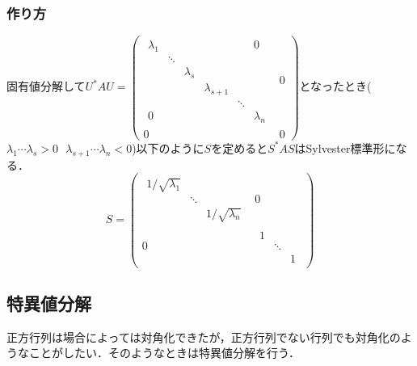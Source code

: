 \subsubsection{作り方}
固有値分解して$U^{\ast}AU=
\left( \begin{array}{c|c}
  \begin{array}{cccccc}
    {\lambda}_1&&&&&0\\
    &\ddots&&&&\\
    &&{\lambda}_s&&&\\
    &&&{\lambda}_{s+1}&&\\
    &&&&\ddots&\\
    0&&&&&{\lambda}_{n}
  \end{array}&0\\\hline
  0&0
\end{array}\right)$となったとき(${\lambda}_1 \cdots {\lambda}_s >0\ \ \ {\lambda}_{s+1}\cdots {\lambda}_n <0$)以下のように$S$を定めると$S^{\ast}AS$はSylvester標準形になる．
\begin{equation}
  S=
  \left( \begin{array}{c|c}
    \begin{array}{ccc}
      1/\sqrt{{\lambda}_1}&&\\
      &\ddots&\\
      &&1/\sqrt{{\lambda}_n}
    \end{array}&0\\\hline
    0&
    \begin{array}{ccc}
      1&&\\
      &\ddots&\\
      &&1
    \end{array}
  \end{array}\right)
\end{equation}

\subsection{特異値分解}
正方行列は場合によっては対角化できたが，正方行列でない行列でも対角化のようなことがしたい．そのようなときは特異値分解を行う．

